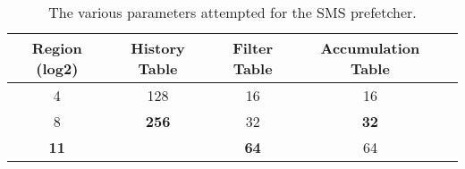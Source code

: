 \begin{table}[htbp]
  \centering
  \begin{tabular}{|c|c|c|c|c|}
    \hline
    \textbf{Region (log2)} & \textbf{History Table} & \textbf{Filter Table} & \textbf{Accumulation Table} \\ \hline
    4  & 128 & 16 & 16 \\ \hline
    8  & \textbf{256} & 32&  \textbf{32}\\ \hline
    \textbf{11} &     & \textbf{64}&  64\\ \hline
  \end{tabular}
  \caption{The various parameters attempted for the SMS prefetcher.}
  \label{tab:smssettings}
\end{table}







